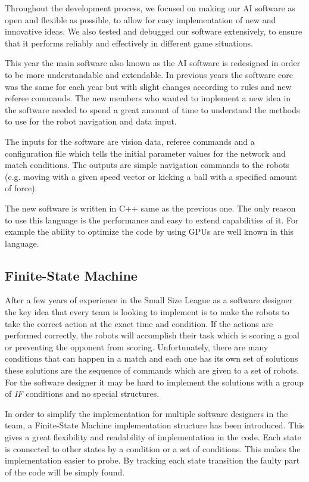 \documentclass[runningheads]{llncs}
\begin{document}
Throughout the development process, we focused on making our AI software as open and flexible as possible, to allow for easy implementation of new and innovative ideas. We also tested and debugged our software extensively, to ensure that it performs reliably and effectively in different game situations.




This year the main software also known as the AI software is redesigned in order to be more understandable and extendable. In previous years the software core was the same for each year but with slight changes according to rules and new referee commands. The new members who wanted to implement a new idea in the software needed to spend a great amount of time to understand the methods to use for the robot navigation and data input.

The inputs for the software are vision data, referee commands and a configuration file which tells the initial parameter values for the network and match conditions. The outputs are simple navigation commands to the robots (e.g. moving with a given speed vector or kicking a ball with a specified amount of force).

The new software is written in C++ same as the previous one. The only reason to use this language is the performance and easy to extend capabilities of it. For example the ability to optimize the code by using GPUs are well known in this language.

\subsection{Finite-State Machine} 
After a few years of experience in the Small Size League as a software designer the key idea that every team is looking to implement is to make the robots to take the correct action at the exact time and condition. If the actions are performed correctly, the robots will accomplish their task which is scoring a goal or preventing the opponent from scoring. Unfortunately, there are many conditions that can happen in a match and each one has its own set of solutions these solutions are the sequence of commands which are given to a set of robots. For the software designer it may be hard to implement the solutions with a group of \textit{IF} conditions and no special structures.

In order to simplify the implementation for multiple software designers in the team, a Finite-State Machine implementation structure has been introduced. This gives a great flexibility and readability of implementation in the code. Each state is connected to other states by a condition or a set of conditions. This makes the implementation easier to probe. By tracking each state transition the faulty part of the code will be simply found.
\end{document}
